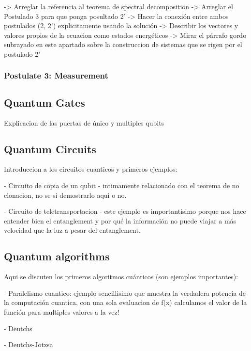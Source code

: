-> Arreglar la referencia al teorema de spectral decomposition
-> Arreglar el Postulado 3 para que ponga posultado 2'
-> Hacer la conexión entre ambos postulados (2, 2') explicitamente usando la solución
-> Describir los vectores y valores propios de la ecuacion como estados energéticos
-> Mirar el párrafo gordo subrayado en este apartado sobre la construccion de sistemas que se rigen por el postulado 2'

\subsubsection{Postulate 3: Measurement}









\subsection{Quantum Gates}

Explicacion de las puertas de único y multiples qubits

\subsection{Quantum Circuits}

Introduccion a los circuitos cuanticos y primeros ejemplos:

- Circuito de copia de un qubit - intimamente relacionado con el teorema de no clonacion, no se si demostrarlo aqui o no.

- Circuito de teletransportacion - este ejemplo es importantisimo porque nos hace entender bien el entanglement y por qué la información no puede viajar a más velocidad que la luz a pesar del entanglement.

\subsection{Quantum algorithms}

Aqui se discuten los primeros algoritmos cuánticos (son ejemplos importantes):

- Paralelismo cuantico: ejemplo sencillisimo que muestra la verdadera potencia de la computación cuantica, con una sola evaluacion de f(x) calculamos el valor de la función para multiples valores a la vez!

- Deutchs

- Deutchs-Jotzsa

